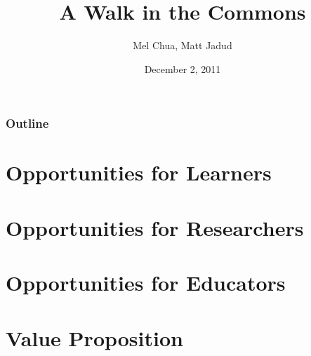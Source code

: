 \documentclass{beamer}
\title{A Walk in the Commons}
\author{Mel Chua, Matt Jadud}
\date{December 2, 2011}
\begin{document}
\titlepage

\begin{frame} 
\frametitle{Outline}
\tableofcontents
\end{frame} 

%

\section{Opportunities for Learners}
\begin{comment}
* What can your students do?
** One example (pick one - Fedora & your first-year class)
** Documentation
** Translation
** Gardening
** Bug fixing
** Testing
** Artwork/design
** Marketing/outreach
** Being active and vocal users (use open source in outreach/service projects - for instance, Mo & the Girl Scouts) / advocacy
** Legal/licensing work (very, *very* basic stuff)
** it's the non-programming skills that are usually in most need by these communities, because nobody knows about them / how to do them, so you can almost become domain "experts" in a project
** Creative repurposing - bringing a project into a new domain it wasn't necessarily originally designed for
\end{comment}

\section{Opportunities for Researchers}
\begin{comment}
Researchers: they exist! (10 seconds each, no more.)
* coleman - ethics in foss communities
* krafft - innovation diffusion
* benkler - "law stuff"
* von hippel - economics
* lawler - wikiversity formation
* dennys and martin - semantic mediawiki
* davis and jabeen - legitimate peripheral participation
* government adoption paper whose author name I forgot
* Mini Case Study: CC licensed video in Zach's research
\end{comment}

\section{Opportunities for Educators}
\begin{comment}
* What can you do?
**  Who's there to help you?
** Who's working on this?
\end{comment}

\section{Value Proposition}
\begin{comment}
* Why make the connection?
** Legitimate Peripheral Participation & situated learning
*** Students can engage -- the currency is desire and energy
** Community of educators
*** Local (institutional)
*** Global (distributed)
*** A community of practice as opposed to a research community
\end{comment}
\end{document}
